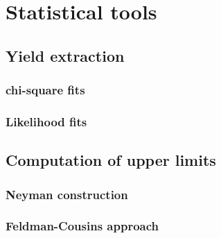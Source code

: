 \chapter{Statistical tools}
\label{chap:stats}
\minitoc
\section{Yield extraction}
\subsection{chi-square fits}
\subsection{Likelihood fits}
\section{Computation of upper limits}
\subsection{Neyman construction}
\subsection{Feldman-Cousins approach}
